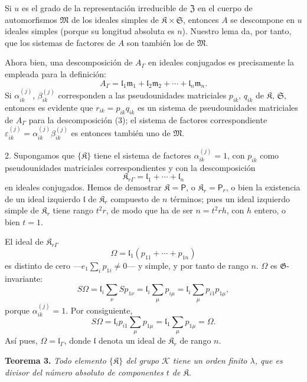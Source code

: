Si \(u\) es el grado de la representación irreducible de \(\mathfrak Z\) en el cuerpo de automorfismos \(\mathfrak M\) de los ideales simples de \(\mathfrak K\times\mathfrak S\), entonces \(A\) se descompone en \(u\) ideales simples (porque su longitud absoluta es \(n\)). Nuestro lema da, por tanto, que los sistemas de factores de \(A\) son también los de \(\mathfrak M\).

Ahora bien, una descomposición de \(A_\Gamma\) en ideales conjugados es precisamente la empleada para la definición:
\[
\tag{3}
A_\Gamma=\mathfrak l_1\mathfrak m_1+\mathfrak l_2\mathfrak m_2+\cdots+\mathfrak l_n\mathfrak m_n.
\]
Si \(\alpha_{ik}^{(j)}\), \(\beta_{ik}^{(j)}\) corresponden a las pseudounidades matriciales \(p_{ik}\), \(q_{ik}\) de \(\mathfrak K\), \(\mathfrak S\), entonces es evidente que \(r_{ik}=p_{ik}q_{ik}\) es un sistema de pseudounidades matriciales de \(A_\Gamma\) para la descomposición (3); el sistema de factores correspondiente \(\varepsilon_{ik}^{(j)}=\alpha_{ik}^{(j)}\beta_{ik}^{(j)}\) es entonces también uno de \(\mathfrak M\).

2. Supongamos que \(\{\mathfrak K\}\) tiene el sistema de factores \(\alpha_{ik}^{(j)}=1\), con \(p_{ik}\) como pseudounidades matriciales correspondientes y con la descomposición
\[
\mathfrak K_{r\Gamma}=\mathfrak l_1+\cdots+\mathfrak l_n
\]
en ideales conjugados. Hemos de demostrar \(\mathfrak K=\mathsf P\), o \(\mathfrak K_r=\mathsf P_r\), o bien la existencia de un ideal izquierdo \(\mathfrak l\) de \(\mathfrak K_r\) compuesto de \(n\) términos; pues un ideal izquierdo simple de \(\mathfrak K_r\) tiene rango \(t^2r\), de modo que ha de ser \(n=t^2rh\), con \(h\) entero, o bien \(t=1\).

El ideal de \(\mathfrak K_{r\Gamma}\)
\[
\Omega=\mathfrak l_1(p_{11}+\cdots+p_{1n})
\]
es distinto de cero ---\(e_1\sum_i p_{1i}\ne0\)--- y simple, y por tanto de rango \(n\). \(\Omega\) es \(\mathfrak G\)-invariante:
\[
S\Omega
=\mathfrak l_i\sum_\nu S p_{1\nu}
=\mathfrak l_i\sum_\mu p_{i\mu}
=\mathfrak l_i\sum_\mu p_{i1}p_{1\mu},
\]
porque \(\alpha_{ik}^{(j)}=1\). Por consiguiente,
\[
S\Omega=\mathfrak l_ip_{i1}\sum_\mu p_{1\mu}
=\mathfrak l_1\sum_\mu p_{1\mu}
=\Omega.
\]
Así pues, \(\Omega=\mathfrak l_\Gamma\), donde \(\mathfrak l\) denota un ideal de \(\mathfrak K_r\) de rango \(n\).

\textbf{Teorema 3.} \emph{Todo elemento \(\{\mathfrak K\}\) del grupo \(\mathscr K\) tiene un orden finito \(\lambda\), que es divisor del número absoluto de componentes \(t\) de \(\mathfrak K\).}

